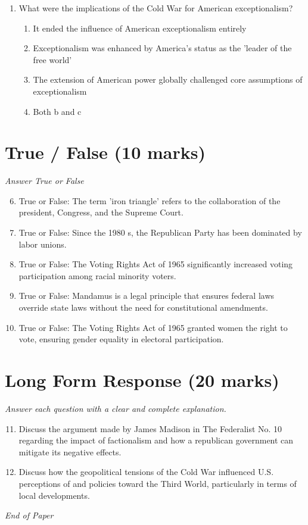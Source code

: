 \documentclass[12pt]{article}
\begin{document}
\begin{enumerate}[label=\arabic*.]
\begin{enumerate}[label=(\alph*)]
    \item All of the above
\end{enumerate}
\item What were the implications of the Cold War for American exceptionalism?
\begin{enumerate}[label=(\alph*)]
    \item It ended the influence of American exceptionalism entirely
    \item Exceptionalism was enhanced by America's status as the 'leader of the free world'
    \item The extension of American power globally challenged core assumptions of exceptionalism
    \item Both b and c
\end{enumerate}
\end{enumerate}

\section*{True / False (10 marks)}
\textit{Answer True or False}
\begin{enumerate}[label=\arabic*.]
\setcounter{enumi}{5}
\item True or False: The term 'iron triangle' refers to the collaboration of the president, Congress, and the Supreme Court.
\item True or False: Since the 1980 s, the Republican Party has been dominated by labor unions.
\item True or False: The Voting Rights Act of 1965 significantly increased voting participation among racial minority voters.
\item True or False: Mandamus is a legal principle that ensures federal laws override state laws without the need for constitutional amendments.
\item True or False: The Voting Rights Act of 1965 granted women the right to vote, ensuring gender equality in electoral participation.
\end{enumerate}

\section*{Long Form Response (20 marks)}
\textit{Answer each question with a clear and complete explanation.}
\begin{enumerate}[label=\arabic*.]
\setcounter{enumi}{10}
\item Discuss the argument made by James Madison in The Federalist No. 10 regarding the impact of factionalism and how a republican government can mitigate its negative effects.
\item Discuss how the geopolitical tensions of the Cold War influenced U.S. perceptions of and policies toward the Third World, particularly in terms of local developments.
\end{enumerate}

\vfill
\noindent\textit{End of Paper}
\end{document}
